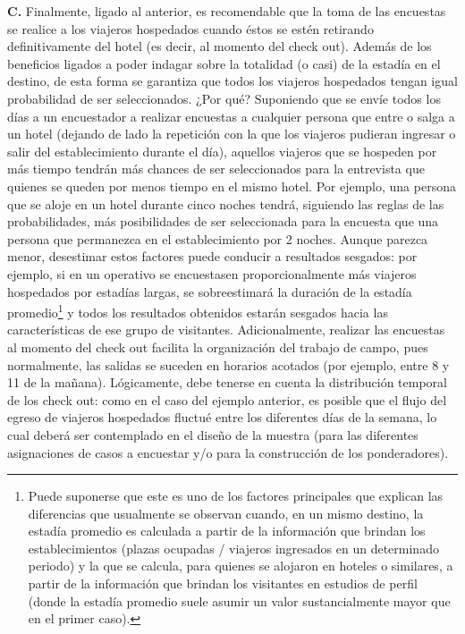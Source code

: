 \documentclass[
]{book}
\begin{document}
\begin{itemize}
  \textbf{C.} Finalmente, ligado al anterior, es recomendable que la toma de las encuestas se realice a los viajeros hospedados cuando éstos se estén retirando definitivamente del hotel (es decir, al momento del check out). Además de los beneficios ligados a poder indagar sobre la totalidad (o casi) de la estadía en el destino, de esta forma se garantiza que todos los viajeros hospedados tengan igual probabilidad de ser seleccionados. ¿Por qué? Suponiendo que se envíe todos los días a un encuestador a realizar encuestas a cualquier persona que entre o salga a un hotel (dejando de lado la repetición con la que los viajeros pudieran ingresar o salir del establecimiento durante el día), aquellos viajeros que se hospeden por más tiempo tendrán más chances de ser seleccionados para la entrevista que quienes se queden por menos tiempo en el mismo hotel. Por ejemplo, una persona que se aloje en un hotel durante cinco noches tendrá, siguiendo las reglas de las probabilidades, más posibilidades de ser seleccionada para la encuesta que una persona que permanezca en el establecimiento por 2 noches. Aunque parezca menor, desestimar estos factores puede conducir a resultados sesgados: por ejemplo, si en un operativo se encuestasen proporcionalmente más viajeros hospedados por estadías largas, se sobreestimará la duración de la estadía promedio\footnote{Puede suponerse que este es uno de los factores principales que explican las diferencias que usualmente se observan cuando, en un mismo destino, la estadía promedio es calculada a partir de la información que brindan los establecimientos (plazas ocupadas / viajeros ingresados en un determinado periodo) y la que se calcula, para quienes se alojaron en hoteles o similares, a partir de la información que brindan los visitantes en estudios de perfil (donde la estadía promedio suele asumir un valor sustancialmente mayor que en el primer caso).} y todos los resultados obtenidos estarán sesgados hacia las características de ese grupo de visitantes. Adicionalmente, realizar las encuestas al momento del check out facilita la organización del trabajo de campo, pues normalmente, las salidas se suceden en horarios acotados (por ejemplo, entre 8 y 11 de la mañana). Lógicamente, debe tenerse en cuenta la distribución temporal de los check out: como en el caso del ejemplo anterior, es posible que el flujo del egreso de viajeros hospedados fluctué entre los diferentes días de la semana, lo cual deberá ser contemplado en el diseño de la muestra (para las diferentes asignaciones de casos a encuestar y/o para la construcción de los ponderadores).
\end{itemize}
\end{document}

